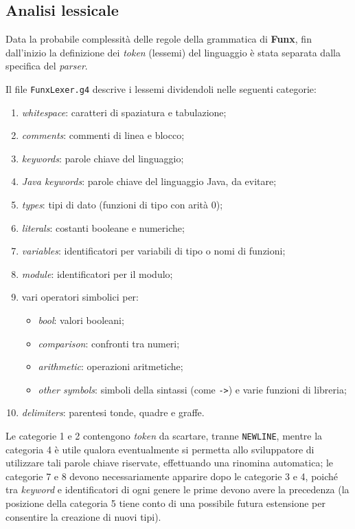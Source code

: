 \subsection{Analisi lessicale}
\label{sec:5-2-lexical-analysis}

Data la probabile complessità delle regole della grammatica di \textbf{Funx}, fin dall'inizio la definizione dei \textit{token} (lessemi)
del linguaggio è stata separata dalla specifica del \textit{parser}.

\noindent Il file \texttt{FunxLexer.g4} descrive i lessemi dividendoli nelle seguenti categorie:
\begin{enumerate}
    \item \textit{whitespace}: caratteri di spaziatura e tabulazione;
    \item \textit{comments}: commenti di linea e blocco;
    \item \textit{keywords}: parole chiave del linguaggio;
    \item \textit{Java keywords}: parole chiave del linguaggio Java, da evitare;
    \item \textit{types}: tipi di dato (funzioni di tipo con arità 0);
    \item \textit{literals}: costanti booleane e numeriche;
    \item \textit{variables}: identificatori per variabili di tipo o nomi di funzioni;
    \item \textit{module}: identificatori per il modulo;
    \item vari operatori simbolici per:
          \begin{itemize}
              \item \textit{bool}: valori booleani;
              \item \textit{comparison}: confronti tra numeri;
              \item \textit{arithmetic}: operazioni aritmetiche;
              \item \textit{other symbols}: simboli della sintassi (come \texttt{->}) e varie funzioni di libreria;
          \end{itemize}
    \item \textit{delimiters}: parentesi tonde, quadre e graffe.
\end{enumerate}

\noindent Le categorie 1 e 2 contengono \textit{token} da scartare, tranne \texttt{NEWLINE}, mentre la categoria 4 è utile
qualora eventualmente si permetta allo sviluppatore di utilizzare tali parole chiave riservate,
effettuando una rinomina automatica; le categorie 7 e 8 devono necessariamente apparire dopo le categorie 3 e 4,
poiché tra \textit{keyword} e identificatori di ogni genere le prime devono avere la precedenza
(la posizione della categoria 5 tiene conto di una possibile futura estensione per consentire la creazione di nuovi tipi).


